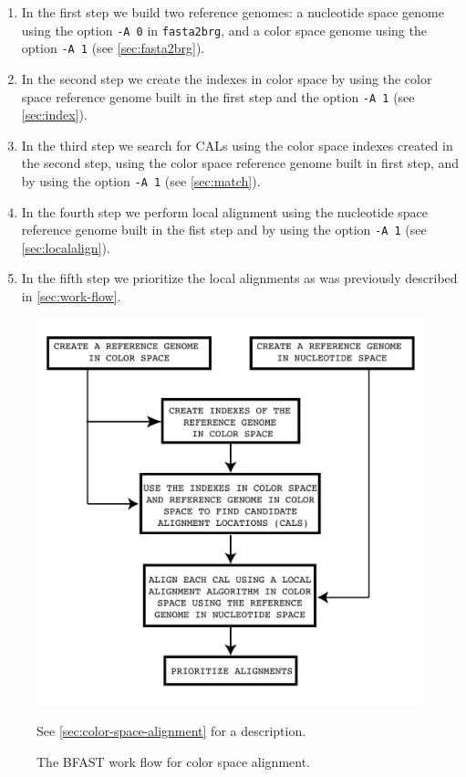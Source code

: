 \documentclass[a4paper,12pt]{book}
\newcommand{\TT}[1]{{\tt #1}} %
\begin{document}
\begin{enumerate}
	\item In the first step we build two reference genomes: a nucleotide space genome using the option \TT{-A 0} in \TT{fasta2brg}, and a color space genome using the option \TT{-A 1} (see \autoref{sec:fasta2brg}).
	\item In the second step we create the indexes in color space by using the color space reference genome built in the first step and the option \TT{-A 1} (see \autoref{sec:index}).
	\item In the third step we search for CALs using the color space indexes created in the second step, using the color space reference genome built in first step, and by using the option \TT{-A 1} (see \autoref{sec:match}).
	\item In the fourth step we perform local alignment using the nucleotide space reference genome built in the fist step and by using the option \TT{-A 1} (see \autoref{sec:localalign}).
	\item In the fifth step we prioritize the local alignments as was previously described in \autoref{sec:work-flow}.
\end{enumerate}

\begin{figure}[t]
	\centering
	\includegraphics[scale=0.75]{work-flow-color.pdf}
	\caption{
	The BFAST work flow for color space alignment.
	}{
	See \autoref{sec:color-space-alignment} for a description.
	\label{fig:work-flow-color}
	}
\end{figure}
\end{document}
